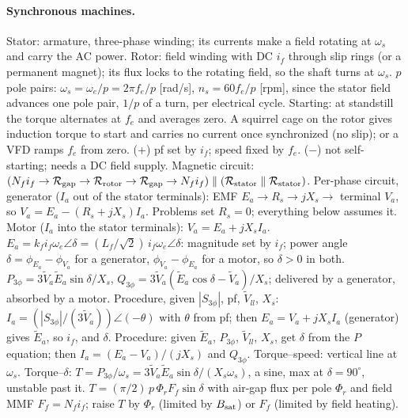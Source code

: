 \documentclass{article}
\begin{document}
\paragraph{Synchronous machines.}
Stator: armature, three-phase winding; its currents make a field rotating at $\omega_s$ and carry the AC power.
Rotor: field winding with DC $i_f$ through slip rings (or a permanent magnet); its flux locks to the rotating field, so the shaft turns at $\omega_s$.
$p$ pole pairs: $\omega_s = \omega_e/p = 2\pi f_e/p$ [rad/s], $n_s = 60 f_e/p$ [rpm], since the stator field advances one pole pair, $1/p$ of a turn, per electrical cycle.
Starting: at standstill the torque alternates at $f_e$ and averages zero. A squirrel cage on the rotor gives induction torque to start and carries no current once synchronized (no slip); or a VFD ramps $f_e$ from zero.
(+) pf set by $i_f$; speed fixed by $f_e$. ($-$) not self-starting; needs a DC field supply.
Magnetic circuit: $(N_f i_f \to \mathcal R_{\rm gap} \to \mathcal R_{\rm rotor} \to \mathcal R_{\rm gap} \to N_f i_f) \parallel (\mathcal R_{\rm stator} \parallel \mathcal R_{\rm stator})$.
Per-phase circuit, generator ($I_a$ out of the stator terminals): EMF $E_a \to R_s \to jX_s \to$ terminal $V_a$, so $V_a = E_a - (R_s + jX_s)I_a$.
Problems set $R_s = 0$; everything below assumes it.
Motor ($I_a$ into the stator terminals): $V_a = E_a + jX_s I_a$.
$E_a = k_f i_f\omega_e\angle\delta = (L_f/\sqrt2)\, i_f\omega_e\angle\delta$: magnitude set by $i_f$; power angle $\delta = \phi_{E_a} - \phi_{V_a}$ for a generator, $\phi_{V_a} - \phi_{E_a}$ for a motor, so $\delta > 0$ in both.
$P_{3\phi} = 3\tilde V_a\tilde E_a\sin\delta/X_s$, $Q_{3\phi} = 3\tilde V_a(\tilde E_a\cos\delta - \tilde V_a)/X_s$; delivered by a generator, absorbed by a motor.
Procedure, given $|S_{3\phi}|$, pf, $\tilde V_{ll}$, $X_s$: $I_a = (|S_{3\phi}|/(3\tilde V_a))\angle(-\theta)$ with $\theta$ from pf; then $E_a = V_a + jX_s I_a$ (generator) gives $\tilde E_a$, so $i_f$, and $\delta$.
Procedure: given $\tilde E_a$, $P_{3\phi}$, $\tilde V_{ll}$, $X_s$, get $\delta$ from the $P$ equation; then $I_a = (E_a - V_a)/(jX_s)$ and $Q_{3\phi}$.
Torque--speed: vertical line at $\omega_s$.
Torque--$\delta$: $T = P_{3\phi}/\omega_s = 3\tilde V_a\tilde E_a\sin\delta/(X_s\omega_s)$, a sine, max at $\delta = 90^\circ$, unstable past it.
$T = (\pi/2)\,p\,\Phi_r F_f\sin\delta$ with air-gap flux per pole $\Phi_r$ and field MMF $F_f = N_f i_f$; raise $T$ by $\Phi_r$ (limited by $B_{\rm sat}$) or $F_f$ (limited by field heating).
\end{document}
